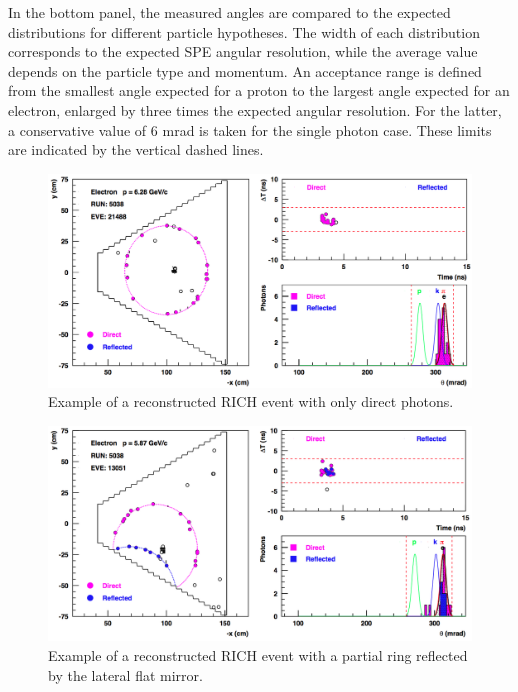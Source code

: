 \documentclass[5p,times,twocolumn]{elsarticle}
\begin{document}
In the bottom panel, the measured angles are compared to the expected distributions for different particle
hypotheses. The width of each distribution corresponds to the expected SPE angular resolution, while the average
value depends on the particle type and momentum. An acceptance range is defined from the smallest angle expected
for a proton to the largest angle expected for an electron, enlarged by three times the expected angular resolution.
For the latter, a conservative value of 6 mrad is taken for the single photon case. These limits are indicated by the
vertical dashed lines. 

\onecolumn
\begin{figure}[t]
\begin{center}
\includegraphics[width=0.9\columnwidth]{Event_21488.png}
\end{center}
\caption{Example of a reconstructed RICH event with only direct photons.} 
\label{Fig:Event1}
\end{figure}

\begin{figure}[t]
\begin{center}
\includegraphics[width=0.9\columnwidth]{Event_13051.png}
\end{center}
\caption{Example of a reconstructed RICH event with a partial ring reflected by the lateral flat mirror.}
\label{Fig:Event2}
\end{figure}
\end{document}
